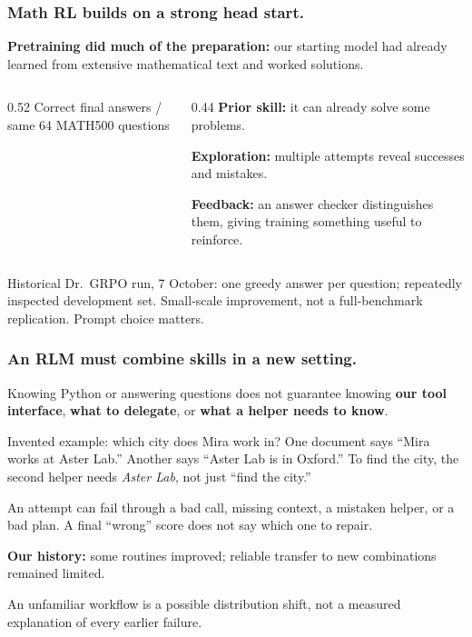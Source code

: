 \documentclass[aspectratio=169,11pt]{beamer}
\newcommand{\aside}[1]{\vfill{\footnotesize\color{Gray}#1\par}}
\begin{document}
\begin{frame}[t]
\frametitle{Math RL builds on a strong head start.}
\textbf{Pretraining did much of the preparation:} our starting model had already learned from extensive mathematical text and worked solutions.
\medskip
\begin{columns}[T,onlytextwidth]
\begin{column}{0.52\textwidth}
{\small Correct final answers / same 64 MATH500 questions}
\begin{center}
\end{center}
\end{column}
\begin{column}{0.44\textwidth}
\small
\textbf{Prior skill:} it can already solve some problems.
\medskip

\textbf{Exploration:} multiple attempts reveal successes and mistakes.
\medskip

\textbf{Feedback:} an answer checker distinguishes them, giving training something useful to reinforce.
\end{column}
\end{columns}
\aside{Historical Dr.\ GRPO run, 7 October: one greedy answer per question; repeatedly inspected development set. Small-scale improvement, not a full-benchmark replication. Prompt choice matters.}
\end{frame}

\begin{frame}[t]
\frametitle{An RLM must combine skills in a new setting.}
Knowing Python or answering questions does not guarantee knowing \textbf{our tool interface}, \textbf{what to delegate}, or \textbf{what a helper needs to know}.
\medskip
\begin{block}{Invented example: which city does Mira work in?}
One document says ``Mira works at Aster Lab.'' Another says ``Aster Lab is in Oxford.'' To find the city, the second helper needs \emph{Aster Lab}, not just ``find the city.''
\end{block}
\medskip
An attempt can fail through a bad call, missing context, a mistaken helper, or a bad plan. A final ``wrong'' score does not say which one to repair.

\medskip
\textbf{Our history:} some routines improved; reliable transfer to new combinations remained limited.
\aside{An unfamiliar workflow is a possible distribution shift, not a measured explanation of every earlier failure.}
\end{frame}
\end{document}
